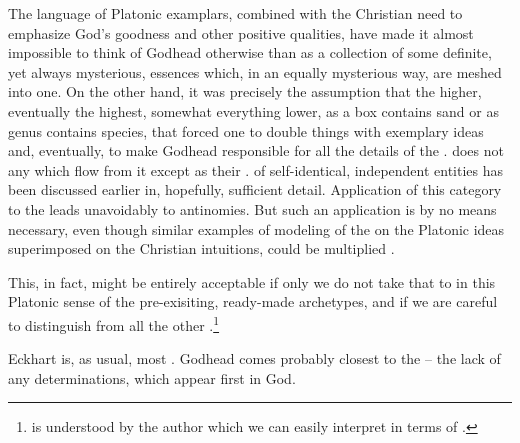 \pa {} The language of Platonic examplars, combined with the
Christian need to emphasize God's goodness and other positive
qualities, have made it almost impossible to think of Godhead
otherwise than as a collection of some definite, yet always
mysterious, essences which, in an equally mysterious way, are meshed
into one.  On the other hand, it was precisely the assumption that the
higher, eventually the highest, somewhat  everything
lower, as a box contains sand or as genus contains species, that
forced one to double things with exemplary ideas and, eventually, to
make Godhead responsible for all the details of the .   does not  any 
which flow from it except as their  . 
 of self-identical, independent entities has been
discussed earlier in, hopefully, sufficient detail.  Application of
this category to the  leads unavoidably to antinomies. 
But such an application is by no means necessary, even though similar
examples of modeling  of the  on the
Platonic ideas superimposed on the Christian intuitions, could be
multiplied .

\pa {} This, in fact, might be entirely
acceptable if only we do not take that to  in this Platonic sense of the pre-exisiting,
ready-made archetypes, and if we are careful to distinguish  from all the other
.\footnote{ is understood by the author
 which we can easily interpret in terms of .}


\pa {}
Eckhart is, as usual, most .  Godhead comes probably closest
to the  -- the lack of any determinations, which
appear first in God.

